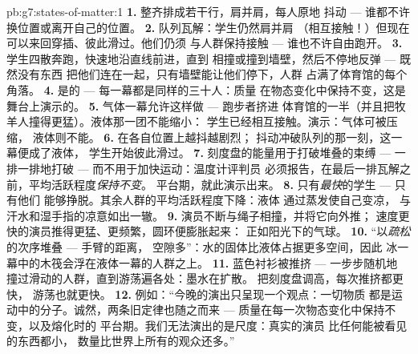\begin{solution}{pb:g7:states-of-matter:1}
\textbf{1.} 整齐排成若干行，肩并肩，每人原地
抖动 --- 谁都不许换位置或离开自己的位置。
\textbf{2.} 队列瓦解：学生仍然肩并肩
（相互接触！）但现在可以来回穿插、彼此滑过。他们仍须
与人群保持接触 --- 谁也不许自由跑开。
\textbf{3.} 学生四散奔跑，快速地沿直线前进，直到
相撞或撞到墙壁，然后不停地反弹 --- 既然没有东西
把他们连在一起，只有墙壁能让他们停下，人群
占满了体育馆的每个角落。
\textbf{4.} 是的 --- 每一幕都是同样的三十人：质量
在物态变化中保持不变，这是舞台上演示的。
\textbf{5.} 气体一幕允许这样做 --- 跑步者挤进
体育馆的一半（并且把牧羊人撞得更猛）。液体那一团不能缩小：
学生已经相互接触。演示：气体可被压缩，
液体则不能。
\textbf{6.} 在各自位置上越抖越剧烈；
抖动冲破队列的那一刻，这一幕便成了液体，
学生开始彼此滑过。
\textbf{7.} 刻度盘的能量用于打破堆叠的束缚 ---
一排一排地打破 --- 而不用于加快运动：温度计评判员
必须报告，在最后一排瓦解之前，平均活跃程度\emph{保持不变}。
平台期，就此演示出来。
\textbf{8.} 只有\emph{最快}的学生 --- 只有他们
能够挣脱。其余人群的平均活跃程度下降：液体
通过蒸发使自己变凉，
与汗水和湿手指的凉意如出一辙。
\textbf{9.} 演员不断与绳子相撞，并将它向外推；
速度更快的演员推得更猛、更频繁，圆环便膨胀起来：
正如阳光下的气球。
\textbf{10.} “以\emph{疏松}的次序堆叠 --- 手臂的距离，
空隙多”：水的固体比液体占据更多空间，因此
冰一幕中的木筏会浮在液体一幕的人群之上。
\textbf{11.} 蓝色衬衫被推挤 --- 一步步随机地
撞过滑动的人群，直到游荡遍各处：墨水在扩散。
把刻度盘调高，每次推挤都更快，
游荡也就更快。
\textbf{12.} 例如：“今晚的演出只呈现一个观点：一切物质
都是运动中的分子。诚然，两条旧定律也随之而来 ---
质量在每一次物态变化中保持不变，以及熔化时的
平台期。我们无法演出的是尺度：真实的演员
比任何能被看见的东西都小，
数量比世界上所有的观众还多。”
\end{solution}
